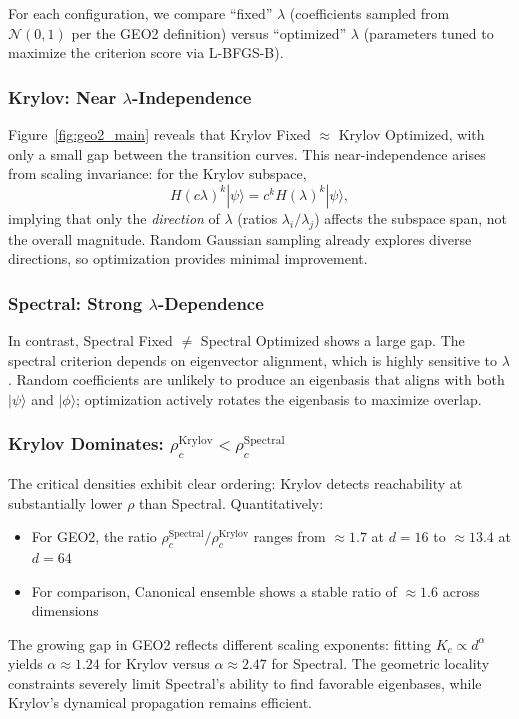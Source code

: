 \documentclass[aps,prx,reprint,superscriptaddress,footnote, twocolumn,notitlepage]{revtex4-2}
\begin{document}
For each configuration, we compare ``fixed'' $\lambda$ (coefficients sampled from $\mathcal{N}(0,1)$ per the GEO2 definition) versus ``optimized'' $\lambda$ (parameters tuned to maximize the criterion score via L-BFGS-B).

\subsubsection{Krylov: Near $\lambda$-Independence}

Figure~\ref{fig:geo2_main} reveals that Krylov Fixed $\approx$ Krylov Optimized, with only a small gap between the transition curves. This near-independence arises from scaling invariance: for the Krylov subspace,
\begin{equation}
    H(c\lambda)^k|\psi\rangle = c^k H(\lambda)^k|\psi\rangle,
\end{equation}
implying that only the \emph{direction} of $\lambda$ (ratios $\lambda_i/\lambda_j$) affects the subspace span, not the overall magnitude. Random Gaussian sampling already explores diverse directions, so optimization provides minimal improvement.

\subsubsection{Spectral: Strong $\lambda$-Dependence}

In contrast, Spectral Fixed $\neq$ Spectral Optimized shows a large gap. The spectral criterion depends on eigenvector alignment, which is highly sensitive to $\lambda$. Random coefficients are unlikely to produce an eigenbasis that aligns with both $|\psi\rangle$ and $|\phi\rangle$; optimization actively rotates the eigenbasis to maximize overlap.

\subsubsection{Krylov Dominates: $\rho_c^{\mathrm{Krylov}} < \rho_c^{\mathrm{Spectral}}$}

The critical densities exhibit clear ordering: Krylov detects reachability at substantially lower $\rho$ than Spectral. Quantitatively:
\begin{itemize}
    \item For GEO2, the ratio $\rho_c^{\mathrm{Spectral}}/\rho_c^{\mathrm{Krylov}}$ ranges from $\approx 1.7$ at $d=16$ to $\approx 13.4$ at $d=64$
    \item For comparison, Canonical ensemble shows a stable ratio of $\approx 1.6$ across dimensions
\end{itemize}
The growing gap in GEO2 reflects different scaling exponents: fitting $K_c \propto d^\alpha$ yields $\alpha \approx 1.24$ for Krylov versus $\alpha \approx 2.47$ for Spectral. The geometric locality constraints severely limit Spectral's ability to find favorable eigenbases, while Krylov's dynamical propagation remains efficient.
\end{document}
